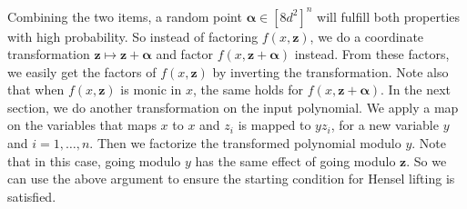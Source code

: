 Combining the two items, a random point $\boldsymbol\alpha\in[8d^2]^n$ will fulfill both properties with high probability. So instead of factoring $f(x,\mathbf z)$, we do a coordinate transformation $\mathbf z\mapsto\mathbf z+\boldsymbol\alpha$ and factor $f(x,\mathbf z+\boldsymbol\alpha)$ instead. From these factors, we easily get the factors of $f(x,\mathbf z)$ by inverting the transformation. Note also that when $f(x,\mathbf z)$ is monic in $x$, the same holds for $f(x,\mathbf z+\boldsymbol\alpha)$.
In the next section, we do another transformation on the input polynomial. We apply a map on the variables that maps $x$ to $x$ and $z_i$ is mapped to $yz_i$, for a new variable $y$ and $i=1,\ldots,n$. Then we factorize the transformed polynomial modulo $y$. Note that in this case, going modulo $y$ has the same effect of going modulo $\mathbf z$. So we can use the above argument to ensure the starting condition for Hensel lifting is satisfied.
